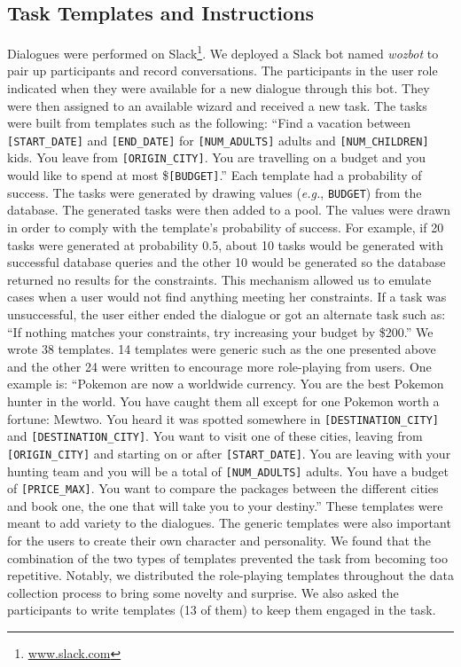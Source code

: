 \documentclass{article}
\theoremstyle{definition}
\newenvironment{example}{\quotation}{\endquotation}
\begin{document}
\subsection{Task Templates and Instructions}
Dialogues were performed on Slack\footnote{\url{www.slack.com}}. We deployed a Slack bot named \textit{wozbot} to pair up participants and record conversations. The participants in the user role indicated when they were available for a new dialogue through this bot. They were then assigned to an available wizard and received a new task. The tasks were built from templates such as the following:
\begin{example}
  ``Find a vacation between \texttt{[START\_DATE]} and \texttt{[END\_DATE]} for \texttt{[NUM\_ADULTS]}
  adults and \texttt{[NUM\_CHILDREN]} kids. You leave from \texttt{[ORIGIN\_CITY]}. You are
  travelling on a budget and you would like to spend at most \$\texttt{[BUDGET]}.''
\end{example}
Each template had a probability of success. The tasks were generated by drawing values (\textit{e.g.}, \texttt{BUDGET}) from the database. The generated tasks were then added to a pool. The values were drawn in order to comply with the template's probability of success. For example, if 20 tasks were generated at probability 0.5, about 10 tasks would be generated with successful database queries and the other 10 would be generated so the database returned no results for the constraints. This mechanism allowed us to emulate cases when a user would not find anything meeting her constraints. If a task was unsuccessful, the user either ended the dialogue or got an alternate task such as:
\begin{example}
  ``If nothing matches your constraints, try increasing your budget by \$200.''
\end{example}
We wrote 38 templates. 14 templates were generic such as the one presented above and the other 24 were written to encourage more role-playing from users. One example is:
\begin{example}
  ``Pokemon are now a worldwide currency. You are the best Pokemon hunter in the
  world. You have caught them all except for one Pokemon worth a fortune: Mewtwo.
  You heard it was spotted somewhere in \texttt{[DESTINATION\_CITY]} and
  \texttt{[DESTINATION\_CITY]}. You want to visit one of these cities, leaving from
  \texttt{[ORIGIN\_CITY]} and starting on or after \texttt{[START\_DATE]}. You are leaving with
  your hunting team and you will be a total of \texttt{[NUM\_ADULTS]} adults. You have a
  budget of \texttt{[PRICE\_MAX]}. You want to compare the packages between the different
  cities and book one, the one that will take you to your destiny.''
\end{example}
These templates were meant to add variety to the dialogues. The generic templates were also important for the users to create their own character and personality. We found that the combination of the two types of templates prevented the task from becoming too repetitive. Notably, we distributed the role-playing templates throughout the data collection process to bring some novelty and surprise. We also asked the participants to write templates (13 of them) to keep them engaged in the task.
\end{document}
